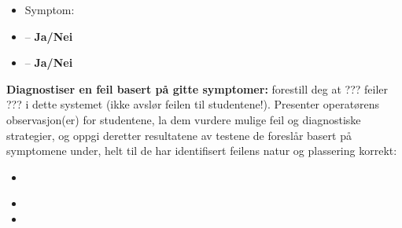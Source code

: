 \begin{itemize}
\item{} Symptom: {\it }
\item{}  -- {\bf Ja/Nei}
\item{}  -- {\bf Ja/Nei}
\end{itemize}


\vskip 10pt


\noindent
{\bf Diagnostiser en feil basert på gitte symptomer:} forestill deg at ??? feiler ??? i dette systemet (ikke avslør feilen til studentene!). Presenter operatørens observasjon(er) for studentene, la dem vurdere mulige feil og diagnostiske strategier, og oppgi deretter resultatene av testene de foreslår basert på symptomene under, helt til de har identifisert feilens natur og plassering korrekt:

\begin{itemize}
\item{} {\it }
\item{} 
\item{} 
\end{itemize}



